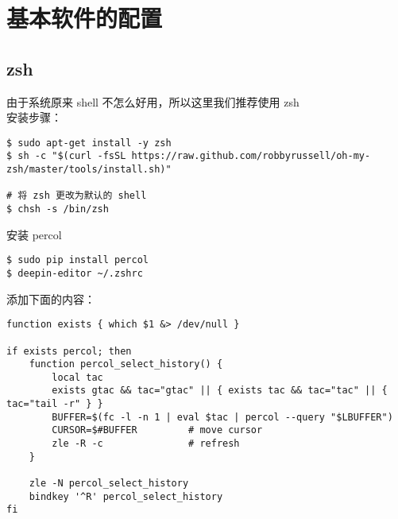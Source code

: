 \section{基本软件的配置}
\subsection{zsh}
由于系统原来 shell 不怎么好用，所以这里我们推荐使用 zsh \\

安装步骤：
\begin{lstlisting}
$ sudo apt-get install -y zsh
$ sh -c "$(curl -fsSL https://raw.github.com/robbyrussell/oh-my-zsh/master/tools/install.sh)"

# 将 zsh 更改为默认的 shell 
$ chsh -s /bin/zsh 
\end{lstlisting}

安装 percol
\begin{lstlisting}
$ sudo pip install percol
$ deepin-editor ~/.zshrc 
\end{lstlisting}

添加下面的内容：
\begin{verbatim}
function exists { which $1 &> /dev/null }

if exists percol; then
    function percol_select_history() {
        local tac
        exists gtac && tac="gtac" || { exists tac && tac="tac" || { tac="tail -r" } }
        BUFFER=$(fc -l -n 1 | eval $tac | percol --query "$LBUFFER")
        CURSOR=$#BUFFER         # move cursor
        zle -R -c               # refresh
    }

    zle -N percol_select_history
    bindkey '^R' percol_select_history
fi
\end{verbatim}

